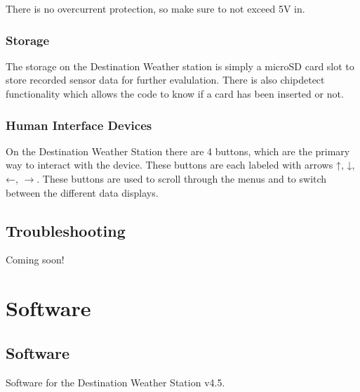 \documentclass[letterpaper,10pt,english]{sphinxmanual}
\begin{document}

\sphinxAtStartPar
{} There is no over\sphinxhyphen{}current protection, so make sure to not exceed 5V in.

\sphinxstepscope


\subsection{Storage}
\label{\detokenize{hardware/storage:storage}}\label{\detokenize{hardware/storage:id1}}\label{\detokenize{hardware/storage::doc}}
\sphinxAtStartPar
The storage on the Destination Weather station is simply a microSD card slot to store recorded sensor data for further evalulation. There is also chip\sphinxhyphen{}detect functionality which allows the code to know if a card has been inserted or not.

\sphinxstepscope


\subsection{Human Interface Devices}
\label{\detokenize{hardware/hid:human-interface-devices}}\label{\detokenize{hardware/hid:hid}}\label{\detokenize{hardware/hid::doc}}
\sphinxAtStartPar
On the Destination Weather Station there are 4 buttons, which are the primary way to interact with the device. These buttons are each labeled with arrows ↑, ↓, ←, \(\rightarrow\). These buttons are used to scroll through the menus and to switch between the different data displays.

\sphinxstepscope


\section{Troubleshooting}
\label{\detokenize{faq/troubleshooting:troubleshooting}}\label{\detokenize{faq/troubleshooting:id1}}\label{\detokenize{faq/troubleshooting::doc}}
\sphinxAtStartPar
Coming soon!


\chapter{Software}
\label{\detokenize{index:software}}
\sphinxstepscope


\section{Software}
\label{\detokenize{software/index:software}}\label{\detokenize{software/index:id1}}\label{\detokenize{software/index::doc}}
\sphinxAtStartPar
Software for the Destination Weather Station v4.5.
\end{document}
